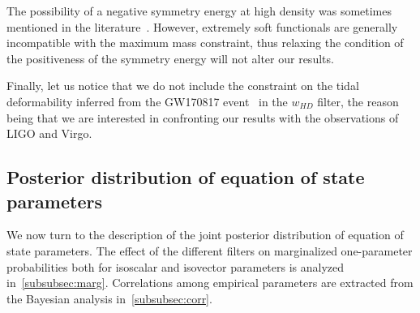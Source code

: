 
The possibility of a negative symmetry energy at high density was sometimes 
mentioned in the literature~\cite{Li2017,Wiringa1988}. 
However, extremely soft functionals are generally incompatible with the maximum 
mass constraint, thus relaxing the condition of the positiveness of the 
symmetry energy will not alter our results.

Finally, let us notice that we do not include the constraint on the tidal
deformability inferred from the GW170817 event~\cite{GWtidal} in the $w_{HD}$ 
filter, the reason being that we are interested in confronting our results with 
the observations of LIGO and Virgo.

\subsection{Posterior distribution of equation of state 
parameters}\label{subsec:posterior}

We now turn to the description of the joint posterior distribution of equation 
of state parameters. The effect of the different filters on 
marginalized one-parameter probabilities both for isoscalar and isovector 
parameters is analyzed in~\ref{subsubsec:marg}. Correlations among empirical 
parameters are extracted from the Bayesian analysis in~\ref{subsubsec:corr}.


